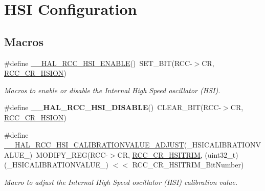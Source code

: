 \hypertarget{group___r_c_c___h_s_i___configuration}{}\section{H\+SI Configuration}
\label{group___r_c_c___h_s_i___configuration}
\subsection*{Macros}
\begin{DoxyCompactItemize}
\item 
\#define \hyperlink{group___r_c_c___h_s_i___configuration_gaab944f562b53fc74bcc0e4958388fd42}{\+\_\+\+\_\+\+H\+A\+L\+\_\+\+R\+C\+C\+\_\+\+H\+S\+I\+\_\+\+E\+N\+A\+B\+LE}()~S\+E\+T\+\_\+\+B\+IT(R\+CC-\/$>$CR, \hyperlink{group___peripheral___registers___bits___definition_gaf4fcacf94a97f7d49a70e089b39cf474}{R\+C\+C\+\_\+\+C\+R\+\_\+\+H\+S\+I\+ON})
\begin{DoxyCompactList}\small\item\em Macros to enable or disable the Internal High Speed oscillator (H\+SI). \end{DoxyCompactList}\item 
\mbox{\label{group___r_c_c___h_s_i___configuration_ga0c0dc8bc0ef58703782f45b4e487c031}} 
\#define {\bfseries \+\_\+\+\_\+\+H\+A\+L\+\_\+\+R\+C\+C\+\_\+\+H\+S\+I\+\_\+\+D\+I\+S\+A\+B\+LE}()~C\+L\+E\+A\+R\+\_\+\+B\+IT(R\+CC-\/$>$CR, \hyperlink{group___peripheral___registers___bits___definition_gaf4fcacf94a97f7d49a70e089b39cf474}{R\+C\+C\+\_\+\+C\+R\+\_\+\+H\+S\+I\+ON})
\item 
\#define \hyperlink{group___r_c_c___h_s_i___configuration_ga36991d340af7ad14b79f204c748b0e3e}{\+\_\+\+\_\+\+H\+A\+L\+\_\+\+R\+C\+C\+\_\+\+H\+S\+I\+\_\+\+C\+A\+L\+I\+B\+R\+A\+T\+I\+O\+N\+V\+A\+L\+U\+E\+\_\+\+A\+D\+J\+U\+ST}(\+\_\+\+H\+S\+I\+C\+A\+L\+I\+B\+R\+A\+T\+I\+O\+N\+V\+A\+L\+U\+E\+\_\+)~M\+O\+D\+I\+F\+Y\+\_\+\+R\+EG(R\+CC-\/$>$CR, \hyperlink{group___peripheral___registers___bits___definition_ga5cb4397b2095c31660a01b748386aa70}{R\+C\+C\+\_\+\+C\+R\+\_\+\+H\+S\+I\+T\+R\+IM}, (uint32\+\_\+t)(\+\_\+\+H\+S\+I\+C\+A\+L\+I\+B\+R\+A\+T\+I\+O\+N\+V\+A\+L\+U\+E\+\_\+) $<$$<$ R\+C\+C\+\_\+\+C\+R\+\_\+\+H\+S\+I\+T\+R\+I\+M\+\_\+\+Bit\+Number)
\begin{DoxyCompactList}\small\item\em Macro to adjust the Internal High Speed oscillator (H\+SI) calibration value. \end{DoxyCompactList}\end{DoxyCompactItemize}


